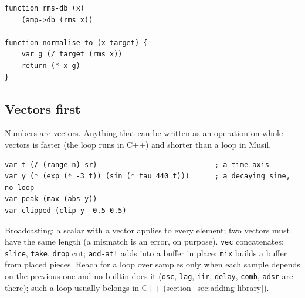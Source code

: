 \documentclass[11pt,a4paper]{article}
\newcommand{\musil}[1]{\lstinline[style=musilinline]{#1}}
\begin{document}

\begin{lstlisting}
function rms-db (x)
    (amp->db (rms x))

function normalise-to (x target) {
    var g (/ target (rms x))
    return (* x g)
}
\end{lstlisting}

\subsection{Vectors first}

Numbers are vectors. Anything that can be written as an operation on whole vectors is
faster (the loop runs in C++) and shorter than a loop in Musil.

\begin{lstlisting}
var t (/ (range n) sr)                            ; a time axis
var y (* (exp (* -3 t)) (sin (* tau 440 t)))      ; a decaying sine, no loop
var peak (max (abs y))
var clipped (clip y -0.5 0.5)
\end{lstlisting}

Broadcasting: a scalar with a vector applies to every element; two vectors must have the
same length (a mismatch is an error, on purpose). \musil{vec} concatenates; \musil{slice},
\musil{take}, \musil{drop} cut; \musil{add-at!} adds into a buffer in place; \musil{mix}
builds a buffer from placed pieces. Reach for a loop over samples only when each sample
depends on the previous one and no builtin does it (\musil{osc}, \musil{lag}, \musil{iir},
\musil{delay}, \musil{comb}, \musil{adsr} are there); such a loop usually belongs in C++
(section~\ref{sec:adding-library}).
\end{document}
